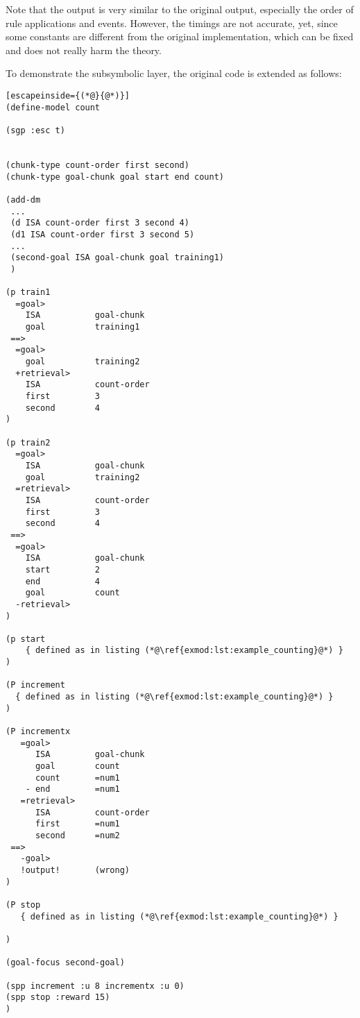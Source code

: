 Note that the output is very similar to the original output, especially the order of rule applications and events. However, the timings are not accurate, yet, since some constants are different from the original implementation, which can be fixed and does not really harm the theory. 

To demonstrate the subsymbolic layer, the original code is extended as follows:

\begin{lstlisting}[escapeinside={(*@}{@*)}]
(define-model count

(sgp :esc t)


(chunk-type count-order first second)
(chunk-type goal-chunk goal start end count)

(add-dm
 ...
 (d ISA count-order first 3 second 4)
 (d1 ISA count-order first 3 second 5)
 ...
 (second-goal ISA goal-chunk goal training1)
 )
 
(p train1
  =goal>
    ISA           goal-chunk
    goal          training1
 ==>
  =goal>
    goal          training2
  +retrieval>
    ISA           count-order
    first         3
    second        4
)

(p train2
  =goal>
    ISA           goal-chunk
    goal          training2
  =retrieval>
    ISA           count-order
    first         3
    second        4
 ==>
  =goal>
    ISA           goal-chunk
    start         2
    end           4
    goal          count
  -retrieval> 
)
 
(p start
    { defined as in listing (*@\ref{exmod:lst:example_counting}@*) }
)

(P increment
  { defined as in listing (*@\ref{exmod:lst:example_counting}@*) }
)

(P incrementx
   =goal>
      ISA         goal-chunk
      goal        count
      count       =num1
    - end         =num1
   =retrieval>
      ISA         count-order
      first       =num1
      second      =num2
 ==>
   -goal>
   !output!       (wrong)
)

(P stop
   { defined as in listing (*@\ref{exmod:lst:example_counting}@*) }

)

(goal-focus second-goal)

(spp increment :u 8 incrementx :u 0)
(spp stop :reward 15)
)
\end{lstlisting}

